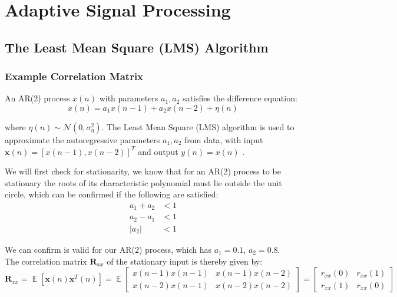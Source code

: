 \documentclass[12pt]{article}
\numberwithin{equation}{section}
\DeclareMathOperator*{\E}{\mathbb{E}}
\begin{document}
\pagebreak
\section{Adaptive Signal Processing} \label{sec: 2-ASP}
	\subsection{The Least Mean Square (LMS) Algorithm} \label{sec: 2-1-LMS}
		\subsubsection{Example Correlation Matrix}
			An AR(2) process $x(n)$ with parameters $a_{1}, a_{2}$ satisfies the difference equation:
			\begin{equation}
			x(n) = a_{1} x(n - 1) + a_{2} x(n - 2) + \eta(n)
			\label{eq: 2-1a-ar_2}
			\end{equation}
			
			where $\eta(n) \sim \mathcal{N}(0, \sigma_{\eta}^{2})$. The Least Mean Square (LMS) algorithm is used to approximate the autoregressive parameters $a_{1}, a_{2}$ from data, with input $\mathbf{x}(n) = [x(n-1), x(n-2)]^{T}$ and output
			$y(n) = x(n)$ .
			
			We will first check for stationarity, we know that for an AR(2) process to be stationary the roots of its characteristic polynomial must lie outside the unit circle, which can be confirmed if the following are satisfied:
			\vspace*{-\baselineskip}
			\begin{align}
			a_1+a_2 & < 1 \\
			a_2-a_1 & < 1 \\
			|a_2| & < 1 
			\label{eq: 2-1a-cond:stationary}
			\end{align}
			
			We can confirm is valid for our AR(2) process, which has $a_1=0.1$, $a_2=0.8$.\\
			The correlation matrix $\mathbf{R}_{xx}$ of the stationary input is thereby given by:
			\begin{equation}
			\mathbf{R}_{xx} = \E[\mathbf{x}(n) \mathbf{x}^{T}(n)] = \E
			\begin{bmatrix}
			x(n-1) x(n-1) & x(n-1) x(n-2) \\
			x(n-2) x(n-1) & x(n-2) x(n-2)
			\end{bmatrix} =
			\begin{bmatrix}
			r_{xx}(0) & r_{xx}(1) \\
			r_{xx}(1) & r_{xx}(0)
			\end{bmatrix}
			\label{eq: 2-1a-cov_ar_2}
			\end{equation}
			
\end{document}
